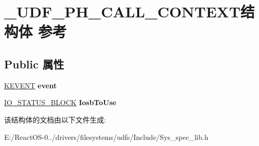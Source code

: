 \hypertarget{struct___u_d_f___p_h___c_a_l_l___c_o_n_t_e_x_t}{}\section{\+\_\+\+U\+D\+F\+\_\+\+P\+H\+\_\+\+C\+A\+L\+L\+\_\+\+C\+O\+N\+T\+E\+X\+T结构体 参考}
\label{struct___u_d_f___p_h___c_a_l_l___c_o_n_t_e_x_t}
\subsection*{Public 属性}
\begin{DoxyCompactItemize}
\item 
\mbox{\label{struct___u_d_f___p_h___c_a_l_l___c_o_n_t_e_x_t_affb3bd34201701fc2f9e9b3a1e866ed8}} 
\hyperlink{struct___k_e_v_e_n_t}{K\+E\+V\+E\+NT} {\bfseries event}
\item 
\mbox{\label{struct___u_d_f___p_h___c_a_l_l___c_o_n_t_e_x_t_a395767706574baca18f07f456fdbac0d}} 
\hyperlink{struct___i_o___s_t_a_t_u_s___b_l_o_c_k}{I\+O\+\_\+\+S\+T\+A\+T\+U\+S\+\_\+\+B\+L\+O\+CK} {\bfseries Iosb\+To\+Use}
\end{DoxyCompactItemize}


该结构体的文档由以下文件生成\+:\begin{DoxyCompactItemize}
\item 
E\+:/\+React\+O\+S-\/0../drivers/filesystems/udfs/\+Include/Sys\+\_\+spec\+\_\+lib.\+h\end{DoxyCompactItemize}
